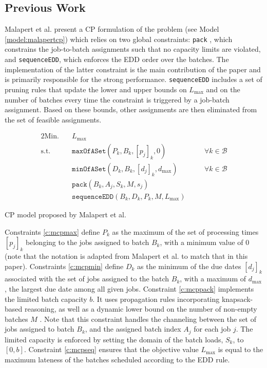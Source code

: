 \documentclass[oribibl]{llncs}
\def\Lmax{{L_{\mathrm{max}}}}
\begin{document}
\subsection{Previous Work}

Malapert et al. \cite{Malapert} present a CP formulation of the problem
(see Model \ref{model:malapertcp}) which relies on two
global constraints: \texttt{pack} \cite{ShawPacking}, which constrains the
job-to-batch assignments such that no capacity limits are violated,
and \texttt{sequenceEDD}, which enforces the EDD order over the batches. The
implementation of the latter constraint is the main contribution of
the paper and is primarily responsible for the strong performance. \texttt{sequenceEDD}
includes a set of pruning rules that update the lower and upper bounds on
$\Lmax$ and on the number of batches every time the constraint
is triggered by a job-batch assignment. Based on these bounds, other
assignments are then eliminated from the set of feasible assignments.

\begin{model}
  \label{model:malapertcp}
  \begin{alignat}{2}
    \mathrm{Min.}\quad & \Lmax &&  \\
    \mathrm{s.t.}\quad \label{c:mcpmax} & \mathtt{maxOfASet}(P_k, B_k, [p_j]_k,
    0) && \quad \forall k \in \mathcal{B} \\
    \label{c:mcpmin} & \mathtt{minOfASet}(D_k, B_k, [d_j]_k, d_\mathrm{max}) &&
    \quad \forall k \in \mathcal{B} \\
    \label{c:mcppack} & \mathtt{pack}(B_k, A_j, S_k, M, s_j) && \\
    \label{c:mcpseq} & \mathtt{sequenceEDD}(B_k, D_k, P_k, M, \Lmax) && 
\end{alignat}
  \caption{CP model proposed by Malapert et al.}
\end{model}

Constraints \eqref{c:mcpmax} define $P_k$ as the maximum of the set
of processing times $[p_j]_k$ belonging to the jobs assigned to
batch $B_k$, with a minimum value of 0 (note that the notation is
adapted from Malapert et al. to match that in this paper). Constraints
\eqref{c:mcpmin} define $D_k$ as the minimum of the due dates $[d_j]_k$
associated with the set of jobs assigned to the batch $B_k$, with a
maximum of $d_\mathrm{max}$, the largest due date among all given jobs.
Constraint \eqref{c:mcppack} implements the limited batch capacity $b$.
It uses propagation rules incorporating knapsack-based reasoning, as
well as a dynamic lower bound on the number of non-empty batches $M$
\cite{Malapert,ShawPacking}. Note that this constraint handles the
channeling between the set of jobs assigned to batch $B_k$, and the
assigned batch index $A_j$ for each job $j$. The limited capacity is
enforced by setting the domain of the batch loads, $S_k$, to $[0, b]$.
Constraint \eqref{c:mcpseq} ensures that the objective value $\Lmax$ is
equal to the maximum lateness of the batches scheduled according to the
EDD rule.
\end{document}
